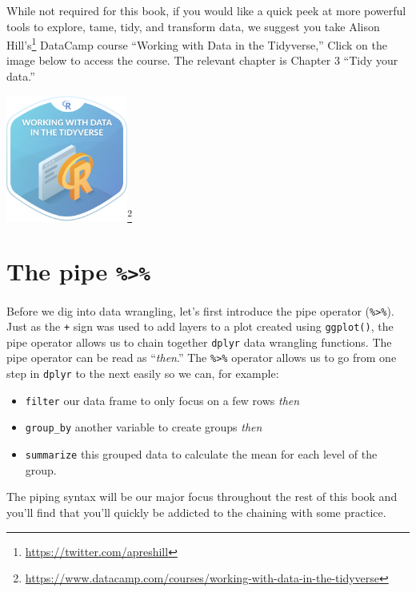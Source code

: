 \documentclass[12pt,]{krantz}
\providecommand{\tightlist}{%
  \setlength{\itemsep}{0pt}\setlength{\parskip}{0pt}}
\renewcommand{\href}[2]{#2\footnote{\url{#1}}}
\begin{document}
While not required for this book, if you would like a quick peek at more
powerful tools to explore, tame, tidy, and transform data, we suggest
you take \href{https://twitter.com/apreshill}{Alison Hill's} DataCamp
course ``Working with Data in the Tidyverse,'' Click on the image below
to access the course. The relevant chapter is Chapter 3 ``Tidy your
data.''

\begin{center}
\href{https://www.datacamp.com/courses/working-with-data-in-the-tidyverse}{\includegraphics[width=0.3\textwidth]{images/datacamp_working_with_data.png}}
\end{center}

\section{\texorpdfstring{The pipe
\texttt{\%\textgreater{}\%}}{The pipe \%\textgreater{}\%}}\label{piping}

Before we dig into data wrangling, let's first introduce the pipe
operator (\texttt{\%\textgreater{}\%}). Just as the \texttt{+} sign was
used to add layers to a plot created using \texttt{ggplot()}, the pipe
operator allows us to chain together \texttt{dplyr} data wrangling
functions. The pipe operator can be read as ``\emph{then}.'' The
\texttt{\%\textgreater{}\%} operator allows us to go from one step in
\texttt{dplyr} to the next easily so we can, for example:

\begin{itemize}
\tightlist
\item
  \texttt{filter} our data frame to only focus on a few rows \emph{then}
\item
  \texttt{group\_by} another variable to create groups \emph{then}
\item
  \texttt{summarize} this grouped data to calculate the mean for each
  level of the group.
\end{itemize}

The piping syntax will be our major focus throughout the rest of this
book and you'll find that you'll quickly be addicted to the chaining
with some practice.
\end{document}
